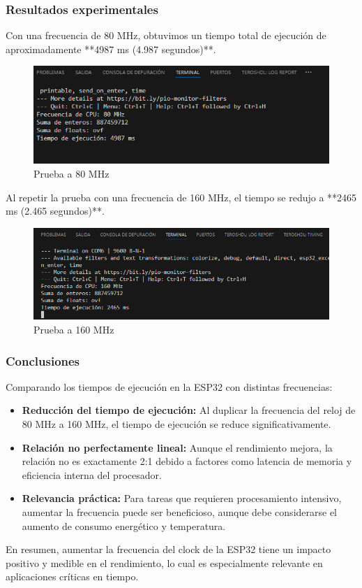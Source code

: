 \subsubsection*{Resultados experimentales}

Con una frecuencia de 80 MHz, obtuvimos un tiempo total de ejecución de aproximadamente **4987 ms (4.987 segundos)**.

\begin{figure}[H]
    \centering
    \includegraphics[width=0.7\linewidth]{img/ESP32Test80MG.png}
    \caption{Prueba a 80 MHz}
    \label{fig:esp32_80mhz}
\end{figure}

Al repetir la prueba con una frecuencia de 160 MHz, el tiempo se redujo a **2465 ms (2.465 segundos)**.

\begin{figure}[H]
    \centering
    \includegraphics[width=0.7\linewidth]{img/ESP32Test160Mhz.png}
    \caption{Prueba a 160 MHz}
    \label{fig:esp32_160mhz}
\end{figure}

\subsubsection*{Conclusiones}

Comparando los tiempos de ejecución en la ESP32 con distintas frecuencias:

\begin{itemize}
  \item \textbf{Reducción del tiempo de ejecución:} Al duplicar la frecuencia del reloj de 80 MHz a 160 MHz, el tiempo de ejecución se reduce significativamente.
  \item \textbf{Relación no perfectamente lineal:} Aunque el rendimiento mejora, la relación no es exactamente 2:1 debido a factores como latencia de memoria y eficiencia interna del procesador.
  \item \textbf{Relevancia práctica:} Para tareas que requieren procesamiento intensivo, aumentar la frecuencia puede ser beneficioso, aunque debe considerarse el aumento de consumo energético y temperatura.
\end{itemize}

En resumen, aumentar la frecuencia del clock de la ESP32 tiene un impacto positivo y medible en el rendimiento, lo cual es especialmente relevante en aplicaciones críticas en tiempo.


